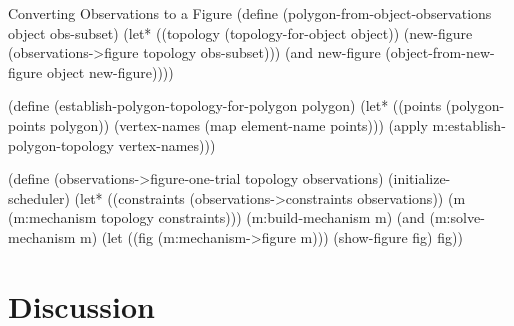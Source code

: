 \begin{code-listing}{Converting Observations to a Figure}
(define (polygon-from-object-observations object obs-subset)
  (let* ((topology (topology-for-object object))
         (new-figure (observations->figure topology obs-subset)))
    (and new-figure (object-from-new-figure object new-figure))))

(define (establish-polygon-topology-for-polygon polygon)
  (let* ((points (polygon-points polygon))
         (vertex-names (map element-name points)))
    (apply m:establish-polygon-topology vertex-names)))

(define (observations->figure-one-trial topology observations)
  (initialize-scheduler)
  (let* ((constraints (observations->constraints observations))
         (m (m:mechanism topology constraints)))
    (m:build-mechanism m)
    (and (m:solve-mechanism m)
         (let ((fig (m:mechanism->figure m)))
           (show-figure fig)
           fig))
\end{code-listing}

\section{Discussion}

